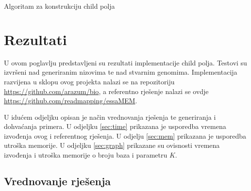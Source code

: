 \documentclass[times, utf8, seminar, numeric]{fer}
\begin{document}
\begin{algorithm}[h]
	\caption{Algoritam za konstrukciju child polja}
	\label{alg:child-array}

	
\end{algorithm}

\chapter{Rezultati}
\label{ch:results}

U ovom poglavlju predstavljeni su rezultati implementacije child polja. Testovi su izvršeni nad generiranim nizovima te nad stvarnim genomima. Implementacija razvijena u sklopu ovog projekta nalazi se na repozitoriju \url{https://github.com/arazum/bio}, a referentno rješenje nalazi se ovdje \url{https://github.com/readmapping/essaMEM}. 

U idućem odjeljku opisan je način vrednovanja rješenja te generiranja i dohvaćanja primera. U odjeljku \ref{sec:time} prikazana je usporedba vremena izvođenja ovog i referentnog rješenja. U odjelju \ref{sec:mem} prikazana je usporedba utroška memorije. U odjeljku \ref{sec:graph} prikazane su ovisnosti vremena izvođenja i utroška memorije o broju baza i parametru $K$.

\section{Vrednovanje rješenja}
\label{sec:eval}
\end{document}
